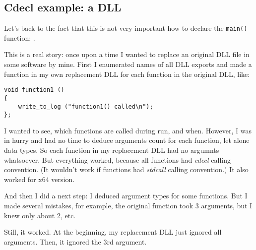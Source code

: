 \subsection{Cdecl example: a DLL}
\label{cdecl_DLL}

Let's back to the fact that this is not very important how to declare the \verb|main()| function: .

This is a real story: once upon a time I wanted to replace an original DLL file in some software by mine.
First I enumerated names of all DLL exports and made a function in my own replacement DLL for each function in the original DLL, like:

\begin{lstlisting}[style=customc]
void function1 ()
{
	write_to_log ("function1() called\n");
};
\end{lstlisting}

I wanted to see, which functions are called during run, and when.
However, I was in hurry and had no time to deduce arguments count for each function, let alone data types.
So each function in my replacement DLL had no argumnts whatsoever.
But everything worked, because all functions had \emph{cdecl} calling convention.
(It wouldn't work if functions had \emph{stdcall} calling convention.)
It also worked for x64 version.

And then I did a next step: I deduced argument types for some functions.
But I made several mistakes, for example, the original function took 3 arguments, but I knew only about 2, etc.

Still, it worked.
At the beginning, my replacement DLL just ignored all arguments.
Then, it ignored the 3rd argument.

